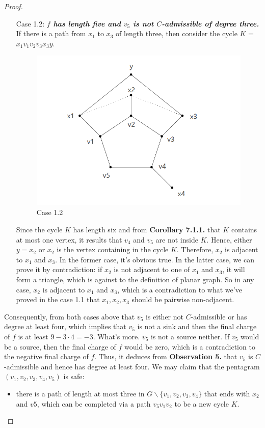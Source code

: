 \begin{proof}
\begin{itemize}
    \item[Case 1.2: ] \textit{\textbf{$f$ has length five and $v_5$ is not $C$-admissible of degree three.}} If there is a path from $x_1$ to $x_3$ of length three, then consider the cycle $K$ = $x_1v_1v_2v_3x_3y$. 
    \begin{figure}[H] %
        \centering %
        \includegraphics[width=0.6 \textwidth]{figure/contradictionpentagram.png} 
        \caption{Case 1.2} %
        \label{figure} %
    \end{figure}
    Since the cycle $K$ has length six and from \textbf{Corollary 7.1.1.} that $K$ contains at most one vertex, it results that $v_4$ and $v_5$ are not inside $K$. Hence, either $y = x_2$ or $x_2$ is the vertex containing in the cycle $K$. Therefore, $x_2$ is adjacent to $x_1$ and $x_3$. In the former case, it's obvious true. In the latter case, we can prove it by contradiction: if $x_2$ is not adjacent to one of $x_1$ and $x_3$, it will form a triangle, which is against to the definition of planar graph. So in any case, $x_2$ is adjacent to $x_1$ and $x_3$, which is a contradiction to what we've proved in the case 1.1 that $x_1, x_2, x_3$ should be pairwise non-adjacent. 
\end{itemize}
Consequently, from both cases above that $v_5$ is either not $C$-admissible or has degree at least four, which implies that $v_5$ is not a sink and then the final charge of $f$ is at least $9 - 3 \cdot 4 = -3$. What's more. $v_5$ is not a source neither. If $v_5$ would be a source, then the final charge of $f$ would be zero, which is a contradiction to the negative final charge of $f$. Thus, it deduces from \textbf{Observation 5.} that $v_5$ is $C$-admissible and hence has degree at least four. We may claim that the pentagram $(v_1, v_2, v_3, v_4, v_5)$ is safe: 
\begin{itemize}
    \item there is a path of length at most three in $G \backslash \{v_1, v_2, v_3, v_4\}$ that ends with $x_2$ and $v5$, which can be completed via a path $v_5v_1v_2$ to be a new cycle $K$.

\end{itemize}
\end{proof}
